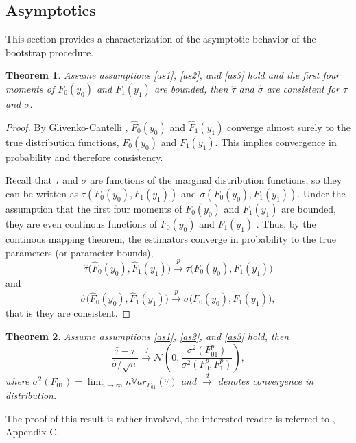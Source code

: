 \documentclass[aodsor,preprint]{imsart}
\numberwithin{equation}{section}
\theoremstyle{plain}
\newtheorem{thm}{Theorem}[section]
\newcommand{\Var}{{\mathbb{V}ar}}
\begin{document}
\subsection{Asymptotics}

This section provides a characterization of the asymptotic behavior of the bootstrap procedure.

\begin{thm}
	Assume assumptions \ref{as1}, \ref{as2}, and \ref{as3} hold and the first four moments of $F_0(y_0)$ and $F_1(y_1)$ are bounded, then $\widehat{\tau}$ and $\widehat{\sigma}$ are consistent for $\tau$ and $\sigma$.
\end{thm}

\begin{proof}
	By Glivenko-Cantelli \citep[see][page 265]{Asymptotic}, $\widehat{F}_0(y_0)$ and $\widehat{F}_1(y_1)$ converge almost surely to the true distribution functions, $F_0(y_0)$ and $F_1(y_1)$. This implies convergence in probability and therefore consistency.
	
	Recall that $\tau$ and $\sigma$ are functions of the marginal distribution functions, so they can be written as $\tau(F_0(y_0), F_1(y_1))$ and $\sigma(F_0(y_0), F_1(y_1))$. Under the assumption that the first four moments of $F_0(y_0)$ and $F_1(y_1)$ are bounded, they are  even continous functions of $F_0(y_0)$ and $F_1(y_1)$ \citep[see][section 5.1]{Imbens_2021}. Thus, by the continous mapping theorem, the estimators converge in probability to the true parameters (or parameter bounds),
	$$
	\widehat{\tau}\big(\widehat{F}_0(y_0), \widehat{F}_1(y_1)\big) \overset{p}{\to} \tau\big(F_0(y_0), F_1(y_1)\big)
	$$
	and
	$$
	\widehat{\sigma}\big(\widehat{F}_0(y_0), \widehat{F}_1(y_1)\big) \overset{p}{\to} \sigma\big(F_0(y_0), F_1(y_1)\big),
	$$
	that is they are consistent.
\end{proof}

\begin{thm}
	Assume assumptions \ref{as1}, \ref{as2}, and \ref{as3} hold, then 
	$$
	\frac{\widehat{\tau} - \tau}{\widehat{\sigma} / \sqrt{n}} \overset{d}{\to} \mathcal{N} \left( 0, \frac{\sigma^2(F_{01}^p)}{\sigma^2(F_0^p, F_1^p)}\right),
	$$
	where $\sigma^2(F_{01}) = \lim_{n \to \infty} n \Var_{F_{01}} (\widehat{\tau})$ and $\overset{d}{\to}$ denotes convergence in distribution.
\end{thm}

The proof of this result is rather involved, the interested reader is referred to \cite{Imbens_2021}, Appendix C.
\end{document}

